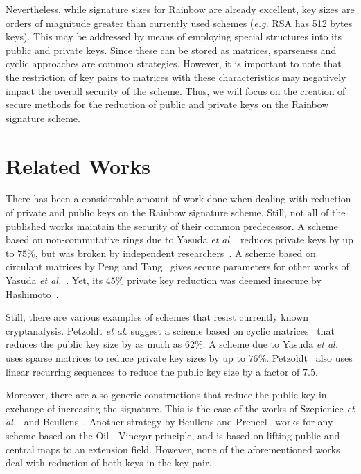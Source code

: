\documentclass[10pt]{article}
\begin{document}
Nevertheless, while signature sizes for Rainbow are already excellent, key
sizes are orders of magnitude greater than currently used schemes (\emph{e.g.}
RSA has 512 bytes keys). This may be addressed by means of employing special
structures into its public and private keys. Since these can be stored as
matrices, sparseness and cyclic approaches are common strategies. However, it
is important to note that the restriction of key pairs to matrices with these
characteristics may negatively impact the overall security of the scheme. Thus,
we will focus on the creation of secure methods for the reduction of public and
private keys on the Rainbow signature scheme.

\section{Related Works}

There has been a considerable amount of work done when dealing with reduction
of private and public keys on the Rainbow signature scheme. Still, not all of
the published works maintain the security of their common predecessor. A scheme
based on non-commutative rings due to Yasuda \emph{et
al.}~\cite{Yasuda:inproc:2012:feb} reduces private keys by up to $75\%$, but
was broken by independent
researchers~\cite{Hashimoto:inproc:2013:feb,Thomae:inproc:2012:sep}. A scheme
based on circulant matrices by Peng and Tang~\cite{Peng:article:2017:jun} gives
secure parameters for other works of Yasuda \emph{et
al.}~\cite{Yasuda:inproc:2013:may,Yasuda:inproc:2014:apr}. Yet, its $45\%$
private key reduction was deemed insecure by
Hashimoto~\cite{Hashimoto:misc:2018:oct}.

Still, there are various examples of schemes that resist currently known
cryptanalysis. Petzoldt \emph{et al.} suggest a scheme based on cyclic
matrices~\cite{Petzoldt:inproc:2010:dec} that reduces the public key size by as
much as $62\%$. A scheme due to Yasuda \emph{et
al.}~\cite{Yasuda:article:2014:sep} uses sparse matrices to reduce private key
sizes by up to $76\%$. Petzoldt~\cite{Petzoldt:phd:2013:jul} also uses linear
recurring sequences to reduce the public key size by a factor of 7.5.

Moreover, there are also generic constructions that reduce the public key in
exchange of increasing the signature. This is the case of the works of
Szepieniec \emph{et al.}~\cite{Szepieniec:inproc:2017:jun} and
Beullens~\cite{Beullens:msc:2017:jun}. Another strategy by Beullens and
Preneel~\cite{Beullens:inproc:2017:dec} works for any scheme based on the
Oil---Vinegar principle, and is based on lifting public and central maps to an
extension field. However, none of the aforementioned works deal with reduction
of both keys in the key pair.
\end{document}
